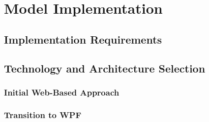 \chapter{Model Implementation}
\label{chap:implementation}


\section{Implementation Requirements}
\label{sec:implementation-requirements}


\section{Technology and Architecture Selection}
\label{sec:technology-selection}

\subsection{Initial Web-Based Approach}

\subsection{Transition to WPF}

